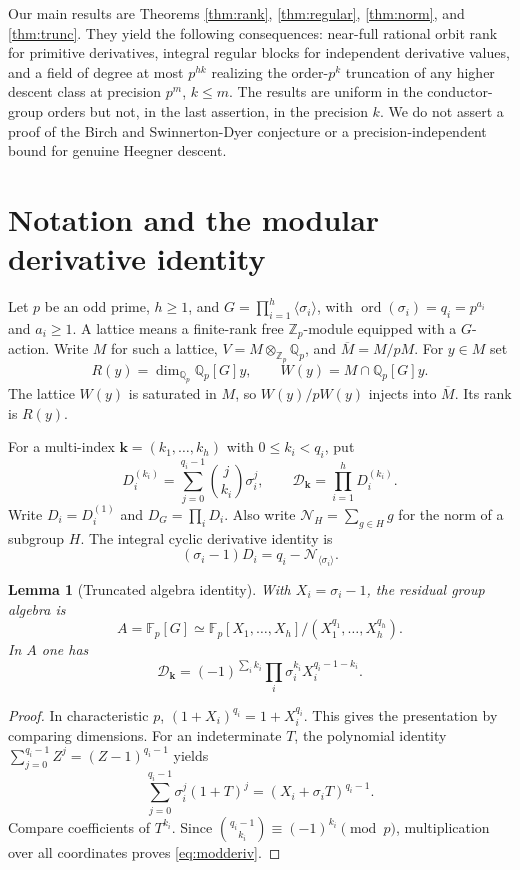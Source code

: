 \documentclass[11pt,a4paper]{article}
\newtheorem{lemma}[theorem]{Lemma}
\theoremstyle{definition}
\theoremstyle{remark}
\newcommand{\Zp}{\mathbb Z_p}
\newcommand{\Qp}{\mathbb Q_p}
\newcommand{\Fp}{\mathbb F_p}
\newcommand{\ord}{\operatorname{ord}}
\newcommand{\N}{\mathcal N}
\newcommand{\D}{\mathcal D}
\begin{document}
Our main results are Theorems \ref{thm:rank}, \ref{thm:regular}, \ref{thm:norm}, and \ref{thm:trunc}. They yield the following consequences: near-full rational orbit rank for primitive derivatives, integral regular blocks for independent derivative values, and a field of degree at most $p^{hk}$ realizing the order-$p^k$ truncation of any higher descent class at precision $p^m$, $k\le m$. The results are uniform in the conductor-group orders but not, in the last assertion, in the precision $k$. We do not assert a proof of the Birch and Swinnerton-Dyer conjecture or a precision-independent bound for genuine Heegner descent.

\section{Notation and the modular derivative identity}
Let $p$ be an odd prime, $h\ge1$, and $G=\prod_{i=1}^h\langle\sigma_i\rangle$, with $\ord(\sigma_i)=q_i=p^{a_i}$ and $a_i\ge1$. A lattice means a finite-rank free $\Zp$-module equipped with a $G$-action. Write $M$ for such a lattice, $V=M\otimes_{\Zp}\Qp$, and $\overline M=M/pM$. For $y\in M$ set
\[
 R(y)=\dim_{\Qp}\Qp[G]y,\qquad
 W(y)=M\cap\Qp[G]y.
\]
The lattice $W(y)$ is saturated in $M$, so $W(y)/pW(y)$ injects into $\overline M$. Its rank is $R(y)$.

For a multi-index $\mathbf k=(k_1,\ldots,k_h)$ with $0\le k_i<q_i$, put
\begin{equation}\label{eq:derivatives}
 D_i^{(k_i)}=\sum_{j=0}^{q_i-1}\binom{j}{k_i}\sigma_i^j,
 \qquad \D_{\mathbf k}=\prod_{i=1}^h D_i^{(k_i)}.
\end{equation}
Write $D_i=D_i^{(1)}$ and $D_G=\prod_iD_i$. Also write $\N_H=\sum_{g\in H}g$ for the norm of a subgroup $H$. The integral cyclic derivative identity is
\begin{equation}\label{eq:basic}
 (\sigma_i-1)D_i=q_i-\N_{\langle\sigma_i\rangle}.
\end{equation}

\begin{lemma}[Truncated algebra identity]\label{lem:identity}
With $X_i=\sigma_i-1$, the residual group algebra is
\[
 A=\Fp[G]\simeq\Fp[X_1,\ldots,X_h]/(X_1^{q_1},\ldots,X_h^{q_h}).
\]
In $A$ one has
\begin{equation}\label{eq:modderiv}
 \D_{\mathbf k}=(-1)^{\sum_i k_i}\prod_i\sigma_i^{k_i}X_i^{q_i-1-k_i}.
\end{equation}
\end{lemma}
\begin{proof}
In characteristic $p$, $(1+X_i)^{q_i}=1+X_i^{q_i}$. This gives the presentation by comparing dimensions. For an indeterminate $T$, the polynomial identity $\sum_{j=0}^{q_i-1}Z^j=(Z-1)^{q_i-1}$ yields
\[
 \sum_{j=0}^{q_i-1}\sigma_i^j(1+T)^j
 =(X_i+\sigma_iT)^{q_i-1}.
\]
Compare coefficients of $T^{k_i}$. Since $\binom{q_i-1}{k_i}\equiv(-1)^{k_i}\pmod p$, multiplication over all coordinates proves \eqref{eq:modderiv}.
\end{proof}
\end{document}
